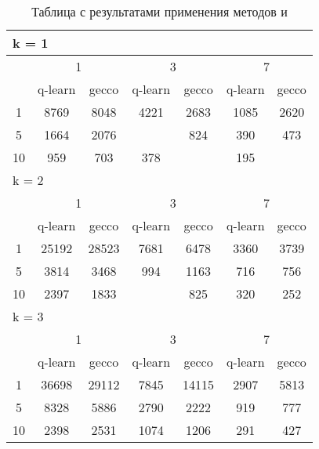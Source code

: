 \begin{table}
  \centering
  \begin{tabular}{|*7{c|}}
    \hline
    \multicolumn{7}{|l|}{k = 1} \\
    \hline
    \multirow{2}{*}{\diagbox{$\mu$}{$\lambda$}} & \multicolumn{2}{c|}{1} & \multicolumn{2}{c|}{3} & \multicolumn{2}{c|}{7} \\
    \cline{2-7}
    & q-learn & gecco & q-learn & gecco & q-learn & gecco \\
    \hline
    1 & 8769 & 8048 & 4221 & 2683 & 1085 & 2620 \\
    \hline
    5 & 1664 & 2076 & \cellcolor{olive}{406} & 824 & 390 & 473 \\
    \hline
    10 & 959 & 703 & 378 & \cellcolor{olive}{358} & 195 & \cellcolor{olive}{167} \\
    \hline
    \multicolumn{7}{|l|}{k = 2} \\
    \hline
    \multirow{2}{*}{\diagbox{$\mu$}{$\lambda$}} & \multicolumn{2}{c|}{1} & \multicolumn{2}{c|}{3} & \multicolumn{2}{c|}{7} \\
    \cline{2-7}
    & q-learn & gecco & q-learn & gecco & q-learn & gecco \\
    \hline
    1 & 25192 & 28523 & 7681 & 6478 & 3360 & 3739 \\
    \hline
    5 & 3814 & 3468 & 994 & 1163 & 716 & 756 \\
    \hline
    10 & 2397 & 1833 & \cellcolor{olive}{445} & 825 & 320 & 252 \\
    \hline
    \multicolumn{7}{|l|}{k = 3} \\
    \hline
    \multirow{2}{*}{\diagbox{$\mu$}{$\lambda$}} & \multicolumn{2}{c|}{1} & \multicolumn{2}{c|}{3} & \multicolumn{2}{c|}{7} \\
    \cline{2-7}
    & q-learn & gecco & q-learn & gecco & q-learn & gecco \\
    \hline
    1 & 36698 & 29112 & 7845 & 14115 & 2907 & 5813 \\
    \hline
    5 & 8328 & 5886 & 2790 & 2222 & 919 & 777 \\
    \hline
    10 & 2398 & 2531 & 1074 & 1206 & 291 & 427 \\
    \hline
  \end{tabular}
  \captionsetup{justification=centering}
  \caption{Таблица с результатами применения методов  и }
\end{table}

